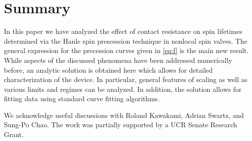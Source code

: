\section{Summary}
\label{s:summary}

In this paper we have analyzed the effect of contact resistance
on spin lifetimes determined via the Hanle spin prescession technique in nonlocal spin valves.
The general expression for the precession curves given in \cref{eq:f} is the main new result.
While aspects of the discussed phenomena have been addressed numerically before,
an analytic solution is obtained here which allows for detailed characterization of the device.
In particular, general features of scaling as well as various limits and regimes can be analyzed.
In addition, the solution allows for fitting data using standard curve fitting algorithms.

\begin{acknowledgments}
  We acknowledge useful discussions with Roland Kawakami, Adrian Swartz, and Sung-Po Chao.
  The work was partially supported by a UCR Senate Research Grant.
\end{acknowledgments}
